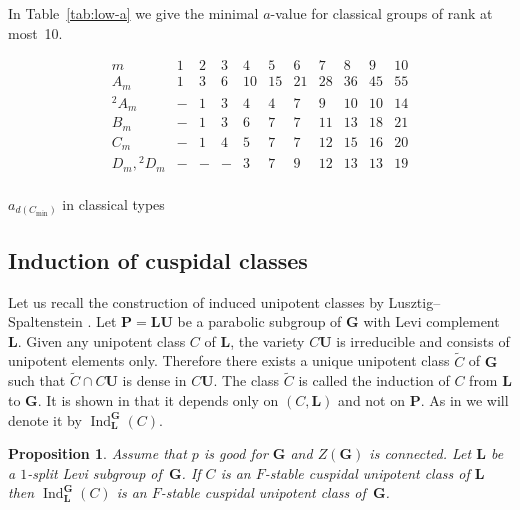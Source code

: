 \documentclass[12pt,leqno,a4paper]{amsart}
\newcommand{\bG}{{\mathbf{G}}}
\newcommand{\bL}{{\mathbf{L}}}
\newcommand{\bP}{{\mathbf{P}}}
\newcommand{\bU}{{\mathbf{U}}}
\newcommand{\Ind}{{\operatorname{Ind}}}
\newcommand{\tw}[1]{{}^{#1}\!}
\newtheorem{prop}[thm]{Proposition}
\theoremstyle{remark}
\begin{document}
In Table~\ref{tab:low-a} we give the minimal $a$-value for classical groups of
rank at most~10.

\begin{table}[htbp]
\[\begin{array}{c|cccccccccc}
  m& 1& 2& 3& 4& 5& 6& 7& 8& 9& 10\\
\hline
 A_m& 1& 3& 6& 10& 15& 21& 28& 36& 45& 55\\
 \tw2A_m& -& 1& 3& 4& 4& 7& 9& 10& 10& 14\\
  B_m& -& 1& 3& 6& 7& 7& 11& 13& 18& 21\\
  C_m& -& 1& 4& 5& 7& 7& 12& 15& 16& 20\\
  D_m,\tw2D_m& -& -& -& 3& 7& 9& 12& 13& 13& 19\\
\end{array}\]
 \caption{$a_{d(C_{\min})}$ in classical types}  \label{tab:low-a}
\end{table}


\subsection{Induction of cuspidal classes}
Let us recall the construction of induced unipotent classes by
Lusztig--Spaltenstein \cite{LuSp}. Let $\bP = \bL \bU$ be a parabolic subgroup
of $\bG$ with Levi complement $\bL$. Given any unipotent class $C$ of $\bL$,
the variety $C \bU$ is irreducible and consists of unipotent elements only.
Therefore there exists a unique unipotent class $\widetilde C$ of $\bG$ such
that $\widetilde C \cap C\bU$ is dense in $C\bU$. The class $\widetilde C$ is
called the induction of $C$ from $\bL$ to $\bG$. It is shown in \cite{LuSp}
that it depends only on $(C,\bL)$ and not on $\bP$. As in \cite{LuSp} we will
denote it by $\Ind_\bL^\bG(C)$.

\begin{prop}   \label{prop:ind-cusp}
 Assume that $p$ is good for $\bG$ and $Z(\bG)$ is connected. Let $\bL$ be a
 $1$-split Levi subgroup of~$\bG$. If $C$ is an $F$-stable cuspidal unipotent
 class of $\bL$ then $\Ind_\bL^\bG(C)$ is an $F$-stable cuspidal unipotent
 class of~$\bG$.
\end{prop}
\end{document}
